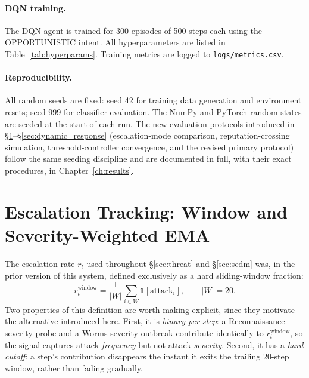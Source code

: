 \paragraph{DQN training.}
The DQN agent is trained for 300 episodes of 500 steps each using the
OPPORTUNISTIC intent.
All hyperparameters are listed in Table~\ref{tab:hyperparams}.
Training metrics are logged to \texttt{logs/metrics.csv}.

\paragraph{Reproducibility.}
All random seeds are fixed: seed 42 for training data generation and
environment resets; seed 999 for classifier evaluation.
The NumPy and PyTorch random states are seeded at the start of each run.
The new evaluation protocols introduced in \S\ref{sec:escalation_tracking}--\S\ref{sec:dynamic_response}
(escalation-mode comparison, reputation-crossing simulation, threshold-controller
convergence, and the revised primary protocol) follow the same seeding
discipline and are documented in full, with their exact procedures, in
Chapter~\ref{ch:results}.

\section{Escalation Tracking: Window and Severity-Weighted EMA}
\label{sec:escalation_tracking}

The escalation rate $r_t$ used throughout \S\ref{sec:threat} and
\S\ref{sec:sedm} was, in the prior version of this system, defined
exclusively as a hard sliding-window fraction:
%
\begin{equation}
  r_t^{\text{window}} = \frac{1}{|W|}\sum_{i \in W} \mathbb{1}[\text{attack}_i],
  \qquad |W| = 20.
\end{equation}
%
Two properties of this definition are worth making explicit, since they
motivate the alternative introduced here. First, it is \emph{binary per
step}: a Reconnaissance-severity probe and a Worms-severity outbreak
contribute identically to $r_t^{\text{window}}$, so the signal captures
attack \emph{frequency} but not attack \emph{severity}. Second, it has a
\emph{hard cutoff}: a step's contribution disappears the instant it exits
the trailing 20-step window, rather than fading gradually.

